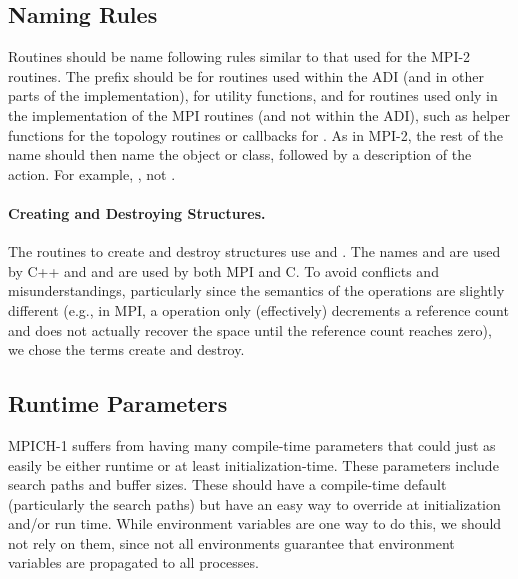 \documentclass{article}
\begin{document}
\subsection{Naming Rules}
Routines should be name following rules similar to that used for the
MPI-2 routines.  The prefix should be  for routines used
within the ADI (and in other parts of the implementation),
 for utility functions, and  for routines used
only in the implementation of the MPI routines (and not within the
ADI), such as helper functions for the topology routines or callbacks
for .  As in MPI-2, the rest of the name should
then name the object or class, followed by a description of the
action.  For example, , not
. 

\paragraph{Creating and Destroying Structures.}
The routines to create and destroy structures use  and
.  The names  and  are used by
C++ and  and  are used by both MPI and C. 
To avoid conflicts and misunderstandings, particularly since the
semantics of the operations are slightly different (e.g., in MPI, a
 operation only (effectively) decrements a reference count
and does not actually recover the space until the reference count
reaches zero), we chose the terms create and destroy.

\subsection{Runtime Parameters}
\label{sec:runtime-params}
MPICH-1 suffers from having many compile-time parameters that could just as
easily be either runtime or at least initialization-time.  These parameters
include search paths and buffer sizes.  These should have a compile-time
default (particularly the search paths) but have an easy way to override at
initialization and/or run time.  While environment variables are one way to do
this, we should not rely on them, since not all environments guarantee that
environment variables are propagated to all processes.
\end{document}
